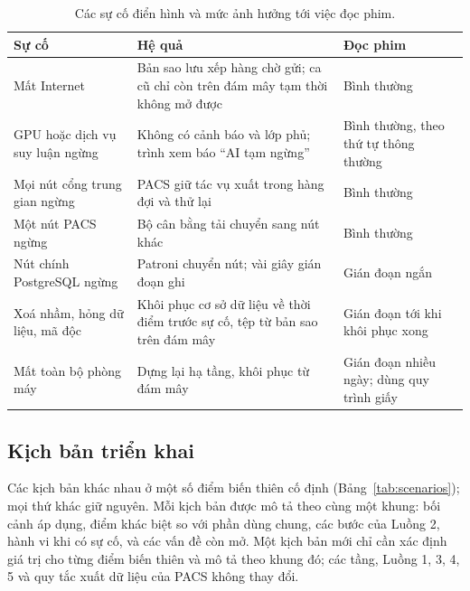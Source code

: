 \begin{table}[H]
\centering
\small
\begin{tabularx}{\textwidth}{@{}p{3.6cm} Y p{2.6cm}@{}}
\toprule
\textbf{Sự cố} & \textbf{Hệ quả} & \textbf{Đọc phim} \\
\midrule
Mất Internet & Bản sao lưu xếp hàng chờ gửi; ca cũ chỉ còn trên đám mây tạm thời không mở được & Bình thường \\
GPU hoặc dịch vụ suy luận ngừng & Không có cảnh báo và lớp phủ; trình xem báo ``AI tạm ngừng'' & Bình thường, theo thứ tự thông thường \\
Mọi nút cổng trung gian ngừng & PACS giữ tác vụ xuất trong hàng đợi và thử lại & Bình thường \\
Một nút PACS ngừng & Bộ cân bằng tải chuyển sang nút khác & Bình thường \\
Nút chính PostgreSQL ngừng & Patroni chuyển nút; vài giây gián đoạn ghi & Gián đoạn ngắn \\
Xoá nhầm, hỏng dữ liệu, mã độc & Khôi phục cơ sở dữ liệu về thời điểm trước sự cố, tệp từ bản sao trên đám mây & Gián đoạn tới khi khôi phục xong \\
Mất toàn bộ phòng máy & Dựng lại hạ tầng, khôi phục từ đám mây & Gián đoạn nhiều ngày; dùng quy trình giấy \\
\bottomrule
\end{tabularx}
\caption{Các sự cố điển hình và mức ảnh hưởng tới việc đọc phim.}
\label{tab:failures}
\end{table}

\subsection{Kịch bản triển khai}
\label{sec:scenarios}

Các kịch bản khác nhau ở một số điểm biến thiên cố định (Bảng~\ref{tab:scenarios});
mọi thứ khác giữ nguyên. Mỗi kịch bản được mô tả theo cùng một khung: bối cảnh áp dụng,
điểm khác biệt so với phần dùng chung, các bước của Luồng 2, hành vi khi có sự cố, và
các vấn đề còn mở. Một kịch bản mới chỉ cần xác định giá trị cho từng điểm biến thiên và
mô tả theo khung đó; các tầng, Luồng 1, 3, 4, 5 và quy tắc xuất dữ liệu của PACS không
thay đổi.

